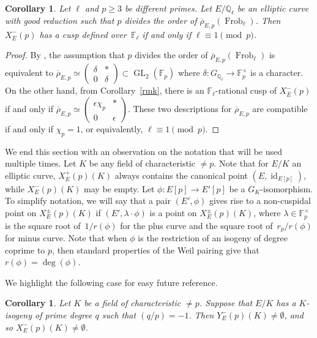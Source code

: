 \documentclass[12pt]{amsart}
\numberwithin{equation}{section}
\newtheorem{corollary}[equation]{Corollary}
\theoremstyle{definition}
\newcommand{\F}{\mathbb{F}}
\newcommand{\Q}{\mathbb{Q}}
\newcommand{\rhobar}{{\overline{\rho}}}
\newcommand{\Xp}{X_E^{-}(p)}
\DeclareMathOperator{\GL}{GL}
\DeclareMathOperator{\Frob}{Frob}
\DeclareMathOperator{\id}{id}
\begin{document}
\begin{corollary} \label{cor:refereeRequest}
Let $\ell$ and $p \geq 3$ be different primes. Let $E/\Q_\ell$ be an elliptic curve with good reduction such that $p$ divides the order of $\rhobar_{E,p}(\Frob_\ell)$. Then $X_{\overline{E}}^-(p)$ has a
cusp defined over~$\F_\ell$ if and only if $\ell \equiv 1 \pmod{p}$. 
\end{corollary}
\begin{proof} By \cite[Lemma 8]{symplectic}, the assumption that $p$ divides the order of $\rhobar_{E,p}(\Frob_\ell)$ is equivalent to 
$\rhobar_{E,p} \simeq \left(\begin{smallmatrix}
				\delta & * \\
				0 & \delta
			\end{smallmatrix} \right) \subset \GL_2(\F_p)$  
where $\delta : G_{\Q_\ell} \to \F_p^\times$ is a character. On the other hand, from Corollary~\ref{rmk}, there is an $\F_\ell$-rational cusp of $X_{\overline{E}}^-(p)$ if and only if
$\rhobar_{E,p} \simeq \left(\begin{smallmatrix}
				\epsilon \chi_p & * \\
				0 & \epsilon
			\end{smallmatrix} \right)$.  
These two descriptions for $\rhobar_{E,p}$ are compatible if and only if $\chi_p = 1$, or equivalently, $\ell \equiv 1 \pmod{p}$. 
\end{proof}

We end this section with an observation on the notation that will be used multiple times.
Let $K$ be any field of characteristic $\neq p$. Note that for $E/K$ an elliptic curve, $X_E^+(p)(K)$ always contains the canonical point $(E, \id_{E[p]})$, while $\Xp(K)$ may be empty.
Let $\phi:E[p]\to E'[p]$ be a $G_K$-isomorphism. 
To simplify notation, we will say that a pair $(E',\phi)$ gives rise to a non-cuspidal point on $X_E^\pm(p)(K)$ if $(E', \lambda \cdot \phi)$ is a point on $X_E^\pm(p)(K)$, where $\lambda \in \F_p^\times$ is the square root of~$1/r(\phi)$ for the plus curve and the square root of~$r_p / r(\phi)$ for minus curve. Note that when $\phi$ is the restriction of an isogeny of degree coprime to $p$, then standard properties of the Weil pairing give that $r(\phi)=\deg(\phi)$.

We highlight the following case for easy future reference.

\begin{corollary}\label{cor:isogeny} Let $K$ be a field of characteristic $\neq p$.
    Suppose that $E/K$ has a $K$-isogeny of prime degree $q$ such that $(q/p)=-1$. Then 
    $Y_E^-(p)(K) \neq \emptyset$, and so $\Xp(K)\neq \emptyset$.
\end{corollary}
\end{document}
